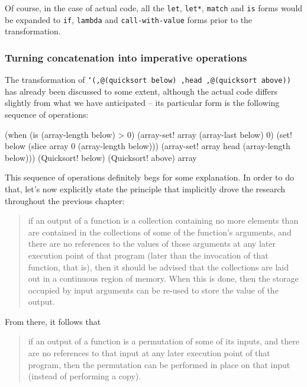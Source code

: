 Of course, in the case of actual code, all the \texttt{let},
\texttt{let*}, \texttt{match} and \texttt{is} forms would be expanded
to \texttt{if}, \texttt{lambda} and \texttt{call-with-value} forms
prior to the transformation.

\subsubsection{Turning concatenation into imperative operations}

The transformation of \texttt{`(,@(quicksort below) ,head ,@(quicksort above))}
has already been discussed to some extent, although the actual code differs
slightly from what we have anticipated -- its particular form is the
following sequence of operations:

\begin{Snippet}
  (when (is (array-length below) > 0)
    (array-set! array (array-last below) 0)
    (set! below (slice array 0 (array-length below)))
    (array-set! array head (array-length below)))
  (Quicksort! below)
  (Quicksort! above)
  array
\end{Snippet}

This sequence of operations definitely begs for some explanation.
In order to do that, let's now explicitly state the principle that
implicitly drove the research throughout the previous chapter:

\begin{quote}
  if an output of a function is a collection containing no more
  elements than are contained in the collections of some of the
  function's arguments, and there are no references to the values
  of those arguments at any later execution point of that program
  (later than the invocation of that function, that is), then
  it should be advised that the collections are laid out in
  a continuous region of memory. When this is done, then
  the storage occupied by input arguments can be re-used to store
  the value of the output.
\end{quote}

From there, it follows that

\begin{quote}
  if an output of a function is a permutation of some of its inputs,
  and there are no references to that input at any later execution point
  of that program, then the permutation can be performed in place
  on that input (instead of performing a copy).
\end{quote}

